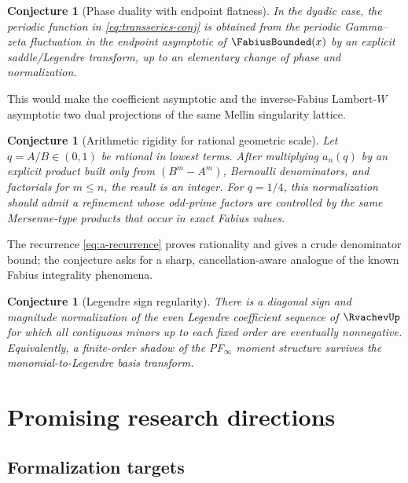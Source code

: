 \documentclass[11pt]{article}
\numberwithin{equation}{section}
\newtheorem{conjecture}[theorem]{Conjecture}
\theoremstyle{definition}
\theoremstyle{remark}
\begin{document}
\begin{conjecture}[Phase duality with endpoint flatness]\label{conj:phase-duality}
In the dyadic case, the periodic function in \eqref{eq:transseries-conj} is obtained from the periodic Gamma--zeta fluctuation in the endpoint asymptotic of $\FabiusBounded(x)$ by an explicit saddle/Legendre transform, up to an elementary change of phase and normalization.
\end{conjecture}

This would make the coefficient asymptotic and the inverse-Fabius Lambert-$W$ asymptotic two dual projections of the same Mellin singularity lattice.

\begin{conjecture}[Arithmetic rigidity for rational geometric scale]\label{conj:arithmetic}
Let $q=A/B\in(0,1)$ be rational in lowest terms.  After multiplying $a_n(q)$ by an explicit product built only from $(B^m-A^m)$, Bernoulli denominators, and factorials for $m\le n$, the result is an integer.  For $q=1/4$, this normalization should admit a refinement whose odd-prime factors are controlled by the same Mersenne-type products that occur in exact Fabius values.
\end{conjecture}

The recurrence \eqref{eq:a-recurrence} proves rationality and gives a crude denominator bound; the conjecture asks for a sharp, cancellation-aware analogue of the known Fabius integrality phenomena.

\begin{conjecture}[Legendre sign regularity]\label{conj:legendre}
There is a diagonal sign and magnitude normalization of the even Legendre coefficient sequence of $\RvachevUp$ for which all contiguous minors up to each fixed order are eventually nonnegative.  Equivalently, a finite-order shadow of the PF$_\infty$ moment structure survives the monomial-to-Legendre basis transform.
\end{conjecture}

\section{Promising research directions}\label{sec:future}

\subsection{Formalization targets}
\end{document}
